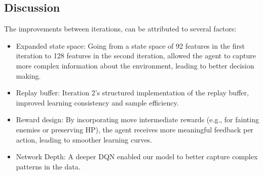 \subsection{Discussion}
The improvements between iterations, can be attributed to several factors:
\begin{itemize}
    \item Expanded state space: Going from a state space of 92 features in the first iteration
    to 128 features in the second iteration, allowed the agent to capture more complex information
    about the environment, leading to better decision making.
    \item Replay buffer: Iteration 2's structured implementation of the replay buffer, improved 
    learning consistency and sample efficiency.
    \item Reward design: By incorporating move intermediate rewards (e.g., for fainting enemies or preserving HP),
    the agent receives more meaningful feedback per action, leading to smoother learning curves.
    \item Network Depth: A deeper DQN enabled our model to better capture complex patterns in the data.
\end{itemize}